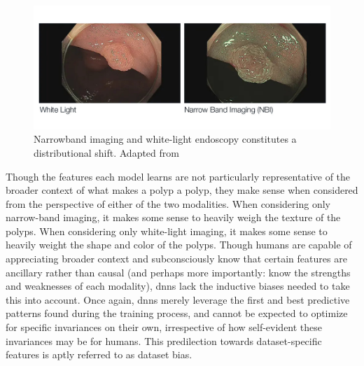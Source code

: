 	\begin{figure}[ht]
		\includegraphics[width=\linewidth]{illustrations/narrow_band.jpg}
		\caption[NBI v White-light imaging]{Narrowband imaging and white-light endoscopy constitutes a distributional shift. Adapted from ~\cite{nbi_img}}
		\label{imaging_modalities}
	\end{figure}

	Though the features each model learns are not particularly representative of the broader context of what makes a polyp a polyp, they make sense when considered from the perspective of either of the two modalities. When considering only narrow-band imaging, it makes some sense to heavily weigh the texture of the polyps. When considering only white-light imaging, it makes some sense to heavily weight the shape and color of the polyps. Though humans are capable of appreciating broader context and subconsciously know that certain features are ancillary rather than causal (and perhaps more importantly: know the strengths and weaknesses of each modality), \glspl{dnn} lack the inductive biases needed to take this into account. Once again, \glspl{dnn} merely leverage the first and best predictive patterns found during the training process, and cannot be expected to optimize for specific invariances on their own, irrespective of how self-evident these invariances may be for humans. This predilection towards dataset-specific features is aptly referred to as dataset bias. 
	
